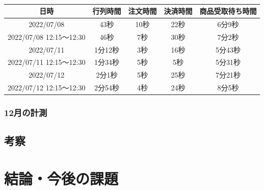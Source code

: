 \documentclass{jsarticle}
\begin{document}
\begin{table}[H]
 \begin{center}
   \caption{}
   \begin{tabular}{|c|c|c|c|c|} \hline
日時 & 行列時間 & 注文時間 & 決済時間 & 商品受取待ち時間 \\ \hline \hline
2022/07/08 & 43秒    & 10秒 & 22秒 & 6分9秒 \\ \hline
2022/07/08 12:15〜12:30 & 46秒    & 7秒 & 30秒  & 7分2秒 \\ \hline \hline

2022/07/11 & 1分12秒 & 3秒  & 16秒 & 5分43秒 \\ \hline
2022/07/11 12:15〜12:30 & 1分34秒 & 5秒 & 5秒   & 5分31秒 \\ \hline \hline

2022/07/12 & 2分1秒  & 5秒  & 25秒 & 7分21秒 \\ \hline
2022/07/12 12:15〜12:30 & 2分54秒 & 4秒 & 24秒  & 8分5秒 \\ \hline

  \end{tabular}
 \label{table6}
 \end{center}
\end{table}












\subsubsection{12月の計測}






\newpage
\subsection{考察}




\newpage

\section{結論・今後の課題}






\newpage
\end{document}
